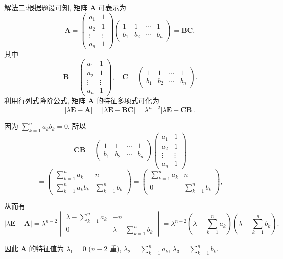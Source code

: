 \documentclass[../../main.tex]{subfiles}
\begin{document}
\begin{solution}
{\color{blue}解法二:}根据题设可知, 矩阵 $\boldsymbol{A}$ 可表示为
$$
\boldsymbol{A} = \begin{pmatrix} a_1 & 1 \\ a_2 & 1 \\ \vdots & \vdots \\ a_n & 1 \end{pmatrix} \begin{pmatrix} 1 & 1 & \cdots & 1 \\ b_1 & b_2 & \cdots & b_n \end{pmatrix} = \boldsymbol{B}\boldsymbol{C},
$$
其中
$$
\boldsymbol{B} = \begin{pmatrix} a_1 & 1 \\ a_2 & 1 \\ \vdots & \vdots \\ a_n & 1 \end{pmatrix}, \quad \boldsymbol{C} = \begin{pmatrix} 1 & 1 & \cdots & 1 \\ b_1 & b_2 & \cdots & b_n \end{pmatrix}.
$$
利用行列式降阶公式, 矩阵 $\boldsymbol{A}$ 的特征多项式可化为
$$
|\lambda\boldsymbol{E} - \boldsymbol{A}| = |\lambda\boldsymbol{E} - \boldsymbol{B}\boldsymbol{C}| = \lambda^{n - 2}|\lambda\boldsymbol{E} - \boldsymbol{C}\boldsymbol{B}|.
$$

因为 $\sum_{k = 1}^n a_kb_k = 0$, 所以
$$
\boldsymbol{C}\boldsymbol{B} = \begin{pmatrix} 1 & 1 & \cdots & 1 \\ b_1 & b_2 & \cdots & b_n \end{pmatrix} \begin{pmatrix} a_1 & 1 \\ a_2 & 1 \\ \vdots & \vdots \\ a_n & 1 \end{pmatrix}
$$
$$
= \begin{pmatrix} \sum_{k = 1}^n a_k & n \\ \sum_{k = 1}^n a_kb_k & \sum_{k = 1}^n b_k \end{pmatrix} = \begin{pmatrix} \sum_{k = 1}^n a_k & n \\ 0 & \sum_{k = 1}^n b_k \end{pmatrix},
$$

从而有
$$
|\lambda\boldsymbol{E} - \boldsymbol{A}| = \lambda^{n - 2} \begin{vmatrix} \lambda - \sum_{k = 1}^n a_k & -n \\ 0 & \lambda - \sum_{k = 1}^n b_k \end{vmatrix} = \lambda^{n - 2} \left( \lambda - \sum_{k = 1}^n a_k \right) \left( \lambda - \sum_{k = 1}^n b_k \right).
$$

因此 $\boldsymbol{A}$ 的特征值为 $\lambda_1 = 0$ ($n - 2$ 重), $\lambda_2 = \sum_{k = 1}^n a_k$, $\lambda_3 = \sum_{k = 1}^n b_k$.
\end{solution}
\end{document}

